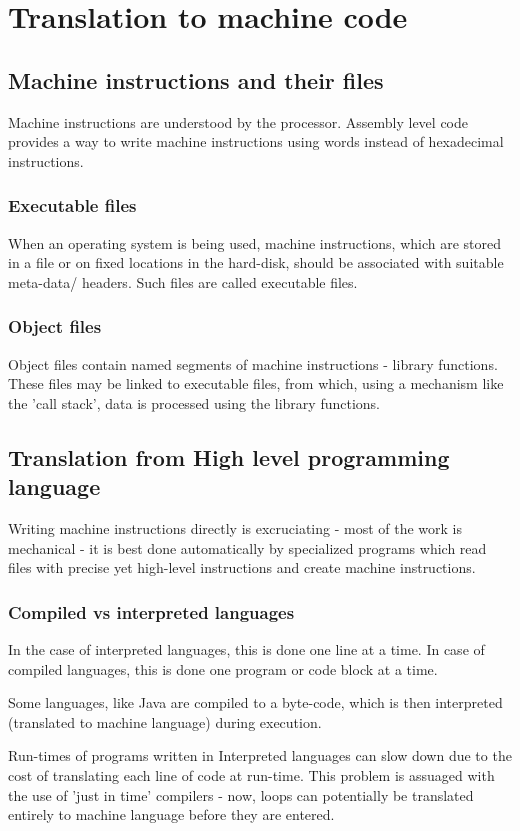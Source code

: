 \chapter{Translation to machine code}
\section{Machine instructions and their files}
Machine instructions are understood by the processor. Assembly level code provides a way to write machine instructions using words instead of hexadecimal instructions.

\subsection{Executable files}
When an operating system is being used, machine instructions, which are stored in a file or on fixed locations in the hard-disk, should be associated with suitable meta-data/ headers. Such files are called executable files.

\subsection{Object files}
Object files contain named segments of machine instructions - library functions. These files may be linked to executable files, from which, using a mechanism like the 'call stack', data is processed using the library functions.

\section{Translation from High level programming language}
Writing machine instructions directly is excruciating - most of the work is mechanical - it is best done automatically by specialized programs which read files with precise yet high-level instructions and create machine instructions.

\subsection{Compiled vs interpreted languages}
In the case of interpreted languages, this is done one line at a time. In case of compiled languages, this is done one program or code block at a time.

Some languages, like Java are compiled to a byte-code, which is then interpreted (translated to machine language) during execution.

Run-times of programs written in Interpreted languages can slow down due to the cost of translating each line of code at run-time. This problem is assuaged with the use of 'just in time' compilers - now, loops can potentially be translated entirely to machine language before they are entered.

